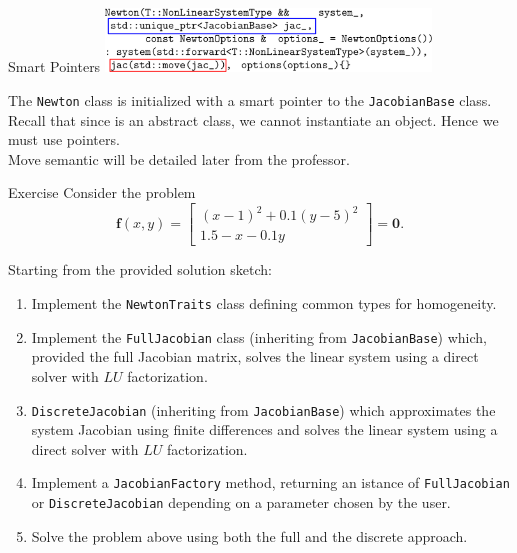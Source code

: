 \documentclass[aspectratio=169,10pt]{beamer}
\begin{document}
\begin{frame}[fragile]{Smart Pointers}
\includegraphics[width=0.65\textwidth]{ipe/newton.pdf}

The \texttt{Newton} class is initialized with a smart pointer to the \texttt{JacobianBase} class. Recall that since is an abstract class, we cannot instantiate an object. Hence we must use pointers. \\

Move semantic will be detailed later from the professor.
\end{frame}


\begin{frame}{Exercise}
Consider the problem
\[
\mathbf{f}(x, y) =
\begin{bmatrix}
(x-1)^2 + 0.1(y - 5)^2 \\
1.5 -x - 0.1y
\end{bmatrix}
=
\mathbf{0}.
\]

Starting from the provided solution sketch:
\begin{enumerate}
\item Implement the \texttt{NewtonTraits} class defining common types for homogeneity.
\item Implement the \texttt{FullJacobian} class (inheriting from \texttt{JacobianBase}) which, provided the full Jacobian matrix, solves the linear system using a direct solver with \(LU\) factorization.
\item \texttt{DiscreteJacobian} (inheriting from \texttt{JacobianBase}) which approximates the system Jacobian using finite differences and solves the linear system using a direct solver with \(LU\) factorization.
\item Implement a \texttt{JacobianFactory} method, returning an istance of \texttt{FullJacobian} or \texttt{DiscreteJacobian} depending on a parameter chosen by the user.
\item Solve the problem above using both the full and the discrete approach.
\end{enumerate}
\end{frame}
\end{document}
